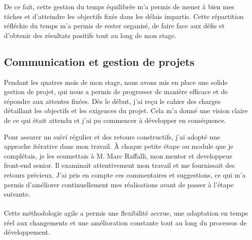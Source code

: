 De ce fait, cette gestion du temps équilibrée m'a permis de mener à bien mes tâches et d'atteindre les objectifs fixés dans les délais impartis. Cette répartition réfléchie du temps m'a permis de rester organisé, de faire face aux défis et d'obtenir des résultats positifs tout au long de mon stage.

\subsection*{Communication et gestion de projets}

Pendant les quatres mois de mon stage, nous avons mis en place une solide gestion de projet, qui nous a permis de progresser de manière efficace et de répondre aux attentes fixées. Dès le début, j’ai reçu le cahier des charges détaillant les objectifs et les exigences du projet. Cela m’a donné une vision claire de ce qui était attendu et j’ai pu commencer à développer en conséquence.

Pour assurer un suivi régulier et des retours constructifs, j’ai adopté une approche itérative dans mon travail. À chaque petite étape ou module que je complétais, je les soumettais à M. Marc Raffalli, mon mentor et developpeur front-end senior. Il examinait attentivement mon travail et me fournissait des retours précieux. J’ai pris en compte ces commentaires et suggestions, ce qui m’a permis d’améliorer continuellement mes réalisations avant de passer à l’étape suivante.
\\ \\
Cette méthodologie agile a permis une flexibilité accrue, une adaptation en temps réel aux changements et une amélioration constante tout au long du processus de développement.
